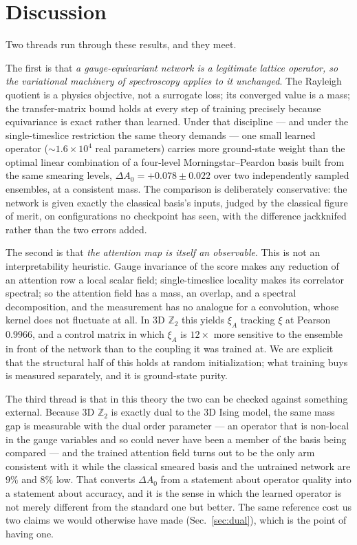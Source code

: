 \documentclass[aps,prl,reprint,superscriptaddress,nofootinbib]{revtex4-2}
\newcommand{\Zt}{\mathbb{Z}_2}
\newcommand{\xiA}{\xi_A}
\begin{document}
\section{Discussion}

Two threads run through these results, and they meet.

The first is that \emph{a gauge-equivariant network is a legitimate lattice
operator, so the variational machinery of spectroscopy applies to it unchanged}.
The Rayleigh quotient is a physics objective, not a surrogate loss; its converged
value is a mass; the transfer-matrix bound holds at every step of training
precisely because equivariance is exact rather than learned. Under that
discipline --- and under the single-timeslice restriction the same theory
demands --- one small learned operator ($\sim1.6\times10^4$ real parameters)
carries more ground-state weight than the optimal linear combination of a
four-level Morningstar--Peardon basis built from the same smearing levels,
$\Delta A_0=+0.078\pm0.022$ over two independently sampled ensembles, at a
consistent mass. The comparison is deliberately conservative: the network is
given exactly the classical basis's inputs, judged by the classical figure of
merit, on configurations no checkpoint has seen, with the difference jackknifed
rather than the two errors added.

The second is that \emph{the attention map is itself an observable}. This is not
an interpretability heuristic. Gauge invariance of the score makes any reduction
of an attention row a local scalar field; single-timeslice locality makes its
correlator spectral; so the attention field has a mass, an overlap, and a
spectral decomposition, and the measurement has no analogue for a convolution,
whose kernel does not fluctuate at all. In 3D $\Zt$ this yields
$\xiA$ tracking $\xi$ at Pearson $0.9966$, and a control matrix in which $\xiA$
is $12\times$ more sensitive to the ensemble in front of the network than to the
coupling it was trained at. We are explicit that the structural half of this
holds at random initialization; what training buys is measured separately, and
it is ground-state purity.

The third thread is that in this theory the two can be checked against something
external. Because 3D $\Zt$ is exactly dual to the 3D Ising model, the same mass
gap is measurable with the dual order parameter --- an operator that is non-local
in the gauge variables and so could never have been a member of the basis being
compared --- and the trained attention field turns out to be the only arm consistent
with it while the classical smeared basis and the untrained network are $9\%$
and $8\%$ low. That converts $\Delta A_0$ from a statement about operator quality
into a statement about accuracy, and it is the sense in which the learned
operator is not merely different from the standard one but better. The same
reference cost us two claims we would otherwise have made
(Sec.~\ref{sec:dual}), which is the point of having one.
\end{document}
